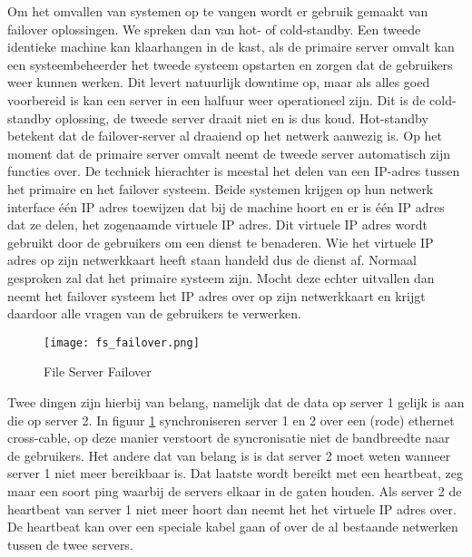 Om het omvallen van systemen op te vangen wordt er gebruik gemaakt van failover oplossingen. We spreken dan van hot- of cold-standby. Een tweede identieke machine kan klaarhangen in de kast, als de primaire server omvalt kan een systeembeheerder het tweede systeem opstarten en zorgen dat de gebruikers weer kunnen werken. Dit levert natuurlijk downtime op, maar als alles goed voorbereid is kan een server in een halfuur weer operationeel zijn. Dit is de cold-standby oplossing, de tweede server draait niet en is dus koud.
Hot-standby betekent dat de failover-server al draaiend op het netwerk aanwezig is. Op het moment dat de primaire server omvalt neemt de tweede server automatisch zijn functies over. De techniek hierachter is meestal het delen van een IP-adres tussen het primaire en het failover systeem. Beide systemen krijgen op hun netwerk interface \'e\'en IP adres toewijzen dat bij de machine hoort en er is \'e\'en IP adres dat ze delen, het zogenaamde virtuele IP adres. Dit virtuele IP adres wordt gebruikt door de gebruikers om een dienst te benaderen. Wie het virtuele IP adres op zijn netwerkkaart heeft staan handeld dus de dienst af. Normaal gesproken zal dat het primaire systeem zijn. Mocht deze echter uitvallen dan neemt het failover systeem het IP adres over op zijn netwerkkaart en krijgt daardoor alle vragen van de gebruikers te verwerken.

\begin{figure}[H]
	\texttt{[image: fs\_failover.png]}
	\caption{File Server Failover}
	\label{FS_failover}
\end{figure}

Twee dingen zijn hierbij van belang, namelijk dat de data op server 1 gelijk is aan die op server 2. In figuur \ref{FS_failover} synchroniseren server 1 en 2 over een (rode) ethernet cross-cable, op deze manier verstoort de syncronisatie niet de bandbreedte naar de gebruikers. Het andere dat van belang is is dat server 2 moet weten wanneer server 1 niet meer bereikbaar is. Dat laatste wordt bereikt met een heartbeat, zeg maar een soort ping waarbij de servers elkaar in de gaten houden. Als server 2 de heartbeat van server 1 niet meer hoort dan neemt het het virtuele IP adres over. De heartbeat kan over een speciale kabel gaan of over de al bestaande netwerken tussen de twee servers.
